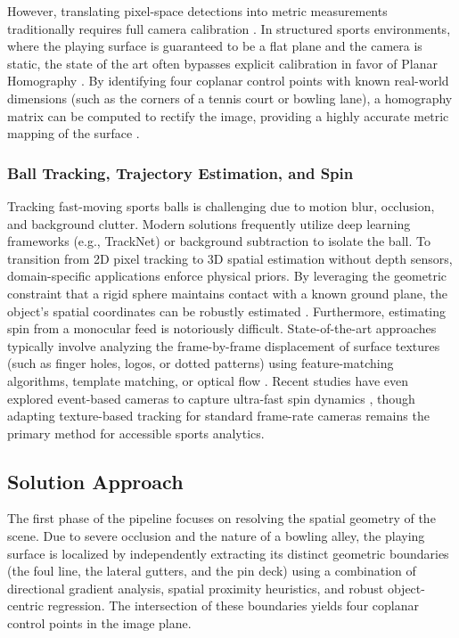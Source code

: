 However, translating pixel-space detections into metric measurements traditionally requires full camera calibration \cite{zhang2000cameracalibration}. In structured sports environments, where the playing surface is guaranteed to be a flat plane and the camera is static, the state of the art often bypasses explicit calibration in favor of Planar Homography  \cite {hartley2004multipleview}. By identifying four coplanar control points with known real-world dimensions (such as the corners of a tennis court or bowling lane), a homography matrix can be computed to rectify the image, providing a highly accurate metric mapping of the surface \cite{yu2009cameracalibration}.

\subsubsection{Ball Tracking, Trajectory Estimation, and Spin}
Tracking fast-moving sports balls is challenging due to motion blur, occlusion, and background clutter. Modern solutions frequently utilize deep learning frameworks (e.g., TrackNet\cite{huang2019tracknetdeeplearningnetwork}) or background subtraction to isolate the ball. To transition from 2D pixel tracking to 3D spatial estimation without depth sensors, domain-specific applications enforce physical priors. By leveraging the geometric constraint that a rigid sphere maintains contact with a known ground plane, the object's spatial coordinates can be robustly estimated \cite{chen2011trajectory}. 
Furthermore, estimating spin from a monocular feed is notoriously difficult. State-of-the-art approaches typically involve analyzing the frame-by-frame displacement of surface textures (such as finger holes, logos, or dotted patterns) using feature-matching algorithms, template matching, or optical flow \cite{gossard2024tabletennisballspin} \cite{lucas1981iterative}. Recent studies have even explored event-based cameras to capture ultra-fast spin dynamics \cite{nakabayashi2024eventbased}, though adapting texture-based tracking for standard frame-rate cameras remains the primary method for accessible sports analytics.






\subsection{Solution Approach}
The first phase of the pipeline focuses on resolving the spatial geometry of the scene. Due to severe occlusion and the nature of a bowling alley, the playing surface is localized by independently extracting its distinct geometric boundaries (the foul line, the lateral gutters, and the pin deck) using a combination of directional gradient analysis, spatial proximity heuristics, and robust object-centric regression. The intersection of these boundaries yields four coplanar control points in the image plane. 

